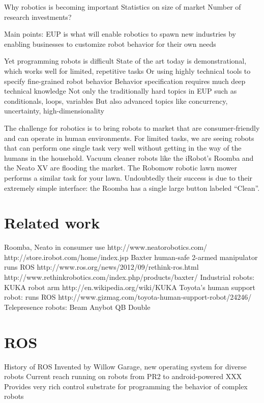 \documentclass{article}
\begin{document}
Why robotics is becoming important
Statistics on size of market
Number of research investments?

Main points:
	EUP is what will enable robotics to spawn new industries
	by enabling businesses to customize robot behavior for their own needs

	Yet programming robots is difficult
	State of the art today is demonstrational, which works well for limited, repetitive tasks
	Or using highly technical tools to specify fine-grained robot behavior
	Behavior specification requires much deep technical knowledge
	Not only the traditionally hard topics in EUP such as conditionals, loops, variables
	But also advanced topics like concurrency, uncertainty, high-dimensionality

The challenge for robotics is to bring robots to market that are consumer-friendly and can operate in human environments. For limited tasks, we are seeing robots that can perform one single task very well without getting in the way of the humans in the household. Vacuum cleaner robots like the iRobot's Roomba and the Neato XV are flooding the market. The Robomow robotic lawn mower performs a similar task for your lawn. Undoubtedly their success is due to their extremely simple interface: the Roomba has a single large button labeled ``Clean''.



\section{Related work}

Roomba, Neato in consumer use
	http://www.neatorobotics.com/
	http://store.irobot.com/home/index.jsp
Baxter human-safe 2-armed manipulator
	runs ROS
	http://www.ros.org/news/2012/09/rethink-ros.html
	http://www.rethinkrobotics.com/index.php/products/baxter/
Industrial robots:
	KUKA robot arm http://en.wikipedia.org/wiki/KUKA
Toyota's human support robot:
	runs ROS
	http://www.gizmag.com/toyota-human-support-robot/24246/
Telepresence robots:
	Beam
	Anybot QB
	Double

\section{ROS}

History of ROS
Invented by Willow Garage, new operating system for diverse robots
Current reach
running on robots from PR2 to android-powered XXX
Provides very rich control substrate for programming the behavior of complex robots
\end{document}
